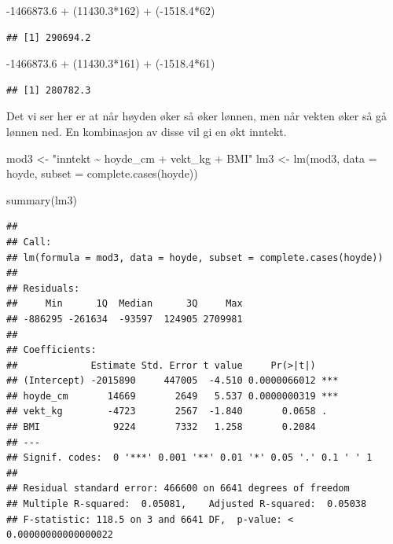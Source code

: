 \documentclass[
  12pt,
  norsk,
]{article}
\newenvironment{Shaded}{\begin{snugshade}}{\end{snugshade}}
\newcommand{\AttributeTok}[1]{\textcolor[rgb]{0.77,0.63,0.00}{#1}}
\newcommand{\DecValTok}[1]{\textcolor[rgb]{0.00,0.00,0.81}{#1}}
\newcommand{\FloatTok}[1]{\textcolor[rgb]{0.00,0.00,0.81}{#1}}
\newcommand{\FunctionTok}[1]{\textcolor[rgb]{0.00,0.00,0.00}{#1}}
\newcommand{\NormalTok}[1]{#1}
\newcommand{\OtherTok}[1]{\textcolor[rgb]{0.56,0.35,0.01}{#1}}
\newcommand{\SpecialCharTok}[1]{\textcolor[rgb]{0.00,0.00,0.00}{#1}}
\newcommand{\StringTok}[1]{\textcolor[rgb]{0.31,0.60,0.02}{#1}}
\begin{document}
\begin{Shaded}
\begin{Highlighting}[]
\SpecialCharTok{{-}}\FloatTok{1466873.6} \SpecialCharTok{+}\NormalTok{ (}\FloatTok{11430.3}\SpecialCharTok{*}\DecValTok{162}\NormalTok{) }\SpecialCharTok{+}\NormalTok{ (}\SpecialCharTok{{-}}\FloatTok{1518.4}\SpecialCharTok{*}\DecValTok{62}\NormalTok{)}
\end{Highlighting}
\end{Shaded}

\begin{verbatim}
## [1] 290694.2
\end{verbatim}

\begin{Shaded}
\begin{Highlighting}[]
\SpecialCharTok{{-}}\FloatTok{1466873.6} \SpecialCharTok{+}\NormalTok{ (}\FloatTok{11430.3}\SpecialCharTok{*}\DecValTok{161}\NormalTok{) }\SpecialCharTok{+}\NormalTok{ (}\SpecialCharTok{{-}}\FloatTok{1518.4}\SpecialCharTok{*}\DecValTok{61}\NormalTok{)}
\end{Highlighting}
\end{Shaded}

\begin{verbatim}
## [1] 280782.3
\end{verbatim}

Det vi ser her er at når høyden øker så øker lønnen, men når vekten øker
så gå lønnen ned. En kombinasjon av disse vil gi en økt inntekt.

\begin{Shaded}
\begin{Highlighting}[]
\NormalTok{mod3 }\OtherTok{\textless{}{-}} \StringTok{"inntekt \textasciitilde{} hoyde\_cm + vekt\_kg + BMI"}
\NormalTok{lm3 }\OtherTok{\textless{}{-}} \FunctionTok{lm}\NormalTok{(mod3, }\AttributeTok{data =}\NormalTok{ hoyde, }\AttributeTok{subset =} \FunctionTok{complete.cases}\NormalTok{(hoyde))}
\end{Highlighting}
\end{Shaded}

\begin{Shaded}
\begin{Highlighting}[]
\FunctionTok{summary}\NormalTok{(lm3)}
\end{Highlighting}
\end{Shaded}

\begin{verbatim}
## 
## Call:
## lm(formula = mod3, data = hoyde, subset = complete.cases(hoyde))
## 
## Residuals:
##     Min      1Q  Median      3Q     Max 
## -886295 -261634  -93597  124905 2709981 
## 
## Coefficients:
##             Estimate Std. Error t value     Pr(>|t|)    
## (Intercept) -2015890     447005  -4.510 0.0000066012 ***
## hoyde_cm       14669       2649   5.537 0.0000000319 ***
## vekt_kg        -4723       2567  -1.840       0.0658 .  
## BMI             9224       7332   1.258       0.2084    
## ---
## Signif. codes:  0 '***' 0.001 '**' 0.01 '*' 0.05 '.' 0.1 ' ' 1
## 
## Residual standard error: 466600 on 6641 degrees of freedom
## Multiple R-squared:  0.05081,    Adjusted R-squared:  0.05038 
## F-statistic: 118.5 on 3 and 6641 DF,  p-value: < 0.00000000000000022
\end{verbatim}
\end{document}

